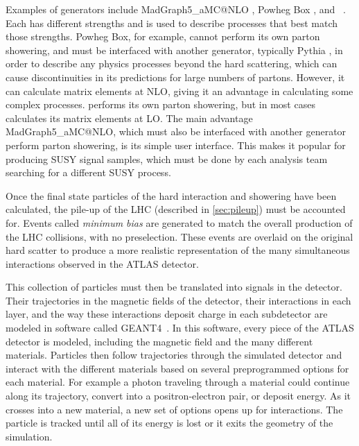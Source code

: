 Examples of generators include {\sc MadGraph5\_aMC@NLO} \cite{Alwall:2014hca}, {\sc Powheg Box} \cite{PowhegBOX1,PowhegBOX2,PowhegBOX3}, and \sherpa~\cite{sherpa}. Each has different strengths and is used to describe processes that best match those strengths. {\sc Powheg Box}, for example, cannot perform its own parton showering, and must be interfaced with another generator, typically {\sc Pythia} \cite{Sjostrand:2006za}, in order to describe any physics processes beyond the hard scattering, which can cause discontinuities in its predictions for large numbers of partons. However, it can calculate matrix elements at \ac{NLO}, giving it an advantage in calculating some complex processes. \sherpa performs its own parton showering, but in most cases calculates its matrix elements at \ac{LO}. The main advantage {\sc MadGraph5\_aMC@NLO}, which must also be interfaced with another generator perform parton showering, is its simple user interface. This makes it popular for producing \ac{SUSY} signal samples, which must be done by each analysis team searching for a different \ac{SUSY} process. 

Once the final state particles of the hard interaction and showering have been calculated, the pile-up of the \ac{LHC} (described in \autoref{sec:pileup}) must be accounted for. Events called \textit{minimum bias} are generated to match the overall production of the \ac{LHC} collisions, with no preselection. These events are overlaid on the original hard scatter to produce a more realistic representation of the many simultaneous interactions observed in the ATLAS detector.

This collection of particles must then be translated into signals in the detector. Their trajectories in the magnetic fields of the detector, their interactions in each layer, and the way these interactions deposit charge in each subdetector are modeled in software called {\sc GEANT4}~\cite{Agostinelli:2002hh}. In this software, every piece of the ATLAS detector is modeled, including the magnetic field and the many different materials. Particles then follow trajectories through the simulated detector and interact with the different materials based on several preprogrammed options for each material. For example a photon traveling through a material could continue along its trajectory, convert into a positron-electron pair, or deposit energy. As it crosses into a new material, a new set of options opens up for interactions. The particle is tracked until all of its energy is lost or it exits the geometry of the simulation.

